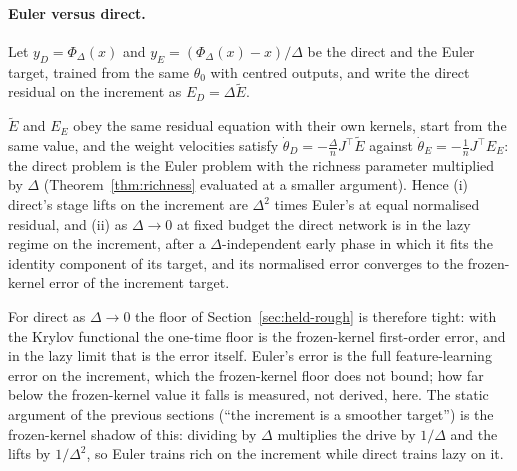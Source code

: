 \paragraph{Euler versus direct.} Let $y_D=\Phi_\Delta(x)$ and
$y_E=(\Phi_\Delta(x)-x)/\Delta$ be the direct and the Euler target, trained from
the same $\theta_0$ with centred outputs, and write the direct residual on the
increment as $E_D=\Delta\tilde E$.
\begin{theorem}
\label{thm:euler}
$\tilde E$ and $E_E$ obey the same residual equation with their own kernels,
start from the same value, and the weight velocities satisfy
$\dot\theta_D=-\frac\Delta nJ^{\!\top}\tilde E$ against
$\dot\theta_E=-\frac1nJ^{\!\top}E_E$: the direct problem is the Euler problem with
the richness parameter multiplied by $\Delta$ (Theorem~\ref{thm:richness}
evaluated at a smaller argument). Hence (i) direct's stage lifts on the
increment are $\Delta^2$ times Euler's at equal normalised residual, and (ii) as
$\Delta\to0$ at fixed budget the direct network is in the lazy regime on the
increment, after a $\Delta$-independent early phase in which it fits the
identity component of its target, and its normalised error converges to the
frozen-kernel error of the increment target.
\end{theorem}
For direct as $\Delta\to0$ the floor of
Section~\ref{sec:held-rough} is therefore tight: with the Krylov functional
the one-time floor is the frozen-kernel first-order error, and in the lazy
limit that is the error itself. Euler's error is the full feature-learning
error on the increment, which the frozen-kernel floor does not bound; how far
below the frozen-kernel value it falls is measured, not derived, here. The static argument of the previous sections (``the increment is a smoother
target'') is the frozen-kernel shadow of this: dividing by $\Delta$ multiplies the
drive by $1/\Delta$ and the lifts by $1/\Delta^2$, so Euler trains rich on the
increment while direct trains lazy on it.

